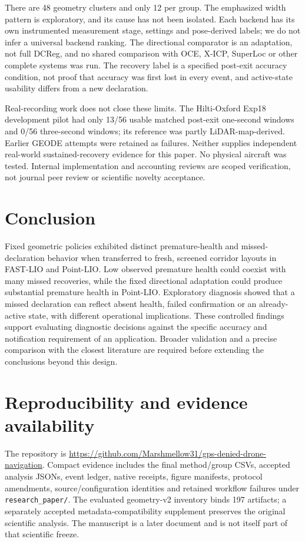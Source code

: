 \documentclass[conference]{IEEEtran}
\newcommand{\repo}{\url{https://github.com/Marshmellow31/gps-denied-drone-navigation}}
\begin{document}
There are 48 geometry clusters and only 12 per group. The emphasized width
pattern is exploratory, and its cause has not been isolated. Each backend
has its own instrumented measurement stage, settings and pose-derived labels;
we do not infer a universal backend ranking. The directional comparator is
an adaptation, not full DCReg, and no shared comparison with OCE, X-ICP,
SuperLoc or other complete systems was run. The recovery label is a specified
post-exit accuracy condition, not proof that accuracy was first lost in
every event, and active-state usability differs from a new declaration.

Real-recording work does not close these limits. The Hilti-Oxford Exp18
development pilot had only 13/56 usable matched post-exit one-second windows
and 0/56 three-second windows; its reference was partly LiDAR-map-derived.
Earlier GEODE attempts were retained as failures. Neither supplies independent
real-world sustained-recovery evidence for this paper. No physical aircraft
was tested. Internal implementation and accounting reviews are scoped
verification, not journal peer review or scientific novelty acceptance.

\section{Conclusion}
Fixed geometric policies exhibited distinct premature-health and
missed-declaration behavior when transferred to fresh, screened corridor
layouts in FAST-LIO and Point-LIO. Low observed premature health could
coexist with many missed recoveries, while the fixed directional adaptation
could produce substantial premature health in Point-LIO. Exploratory
diagnosis showed that a missed declaration can reflect absent health,
failed confirmation or an already-active state, with different operational
implications. These controlled findings support evaluating diagnostic
decisions against the specific accuracy and notification requirement of an
application. Broader validation and a precise comparison with the closest
literature are required before extending the conclusions beyond this design.

\section*{Reproducibility and evidence availability}
The repository is \repo. Compact evidence includes the final method/group
CSVs, accepted analysis JSONs, event ledger, native receipts, figure manifests,
protocol amendments, source/configuration identities and retained workflow
failures under \texttt{research\_paper/}. The evaluated geometry-v2 inventory
binds 197 artifacts; a separately accepted metadata-compatibility supplement
preserves the original scientific analysis. The manuscript is a later
document and is not itself part of that scientific freeze.
\end{document}
